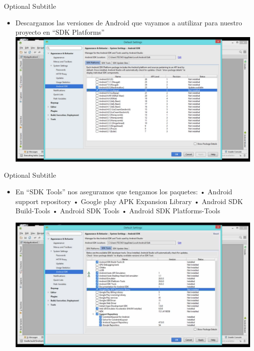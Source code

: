 \documentclass{beamer}
\begin{document}
\begin{frame}{17}{Optional Subtitle}
  \begin{itemize}
  \item {
   Descargamos las versiones de Android que vayamos a autilizar para nuestro proyecto en “SDK Platforms”
  }
  \includegraphics[width=\linewidth]{image/IU17}
  \end{itemize}
\end{frame}

\begin{frame}{18}{Optional Subtitle}
  \begin{itemize}
  \item {
    En “SDK Tools” nos aseguramos que tengamos los paquetes:
•	Android support repository
•	Google play APK Expansion Library
•	Android SDK Build-Tools
•	Android SDK Tools
•	Android SDK Platforms-Tools

  }
  \includegraphics[width=\linewidth]{image/IU18}
  \end{itemize}
\end{frame}
\end{document}
